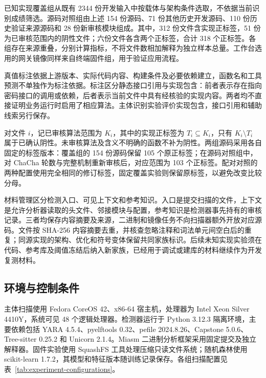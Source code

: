 已知实现覆盖组从既有 2344 份开发输入中按载体与架构条件选取，不依据当前识别成绩筛选。源码对照组由上述 154 份源码、71 份其他历史开发源码、110 份历史验证来源源码和 28 份新审核模块组成。其中，312 份文件含实现正标签，51 份为已审核范围内的阴性文件；六份文件各含两个正标签，合计 318 个正标签。各组存在来源重叠，分别计算指标，不将文件数相加解释为独立样本总量。工作台选用的网关镜像同样来自终端固件组，用于验证应用流程。

真值标注依据上游版本、实际代码内容、构建条件及必要依赖建立，函数名和工具预测不单独作为标注依据。标注区分静态接口引用与实现包含：前者表示存在指向密码接口的调用或依赖，后者表示当前文件中具有经核验的实现内容。两者均不直接证明业务运行时启用了相应算法。主体识别实验评价实现包含，接口引用和辅助线索另行保存。

对文件 $i$，记已审核算法范围为 $K_i$，其中的实现正标签为 $T_i\subseteq K_i$，只有 $K_i\setminus T_i$ 属于已确认阴性。未审核算法及含义不明确的函数不补为阴性。两组源码采用各自固定的标签版本：覆盖组的 154 份源码保留 105 个原正标签；在源码对照组中，对 ChaCha 轮数与完整机制重新审核后，对应范围为 103 个正标签。配对对照的两种配置使用完全相同的修订标签，固定覆盖实验则保留原标签，以避免改变比较分母。

材料管理区分检测入口、可见上下文和参考知识。入口是提交扫描的文件，上下文是允许分析器读取的头文件、邻接模块与配置，参考知识是检测器事先持有的审核记录。三者均保存内容摘要及来源，二进制和镜像任务不向扫描器额外开放对应源码。文件按 SHA-256 内容摘要去重，并核查忽略注释和词法单元间空白后的重复；同源实现的架构、优化和符号变体保留共同家族标识。后续未知实现实验须在代码、参考库及阈值冻结后纳入新家族，已经用于调试或建库的材料继续作为开发复测材料。


\subsection{环境与控制条件}

主体扫描使用 Fedora CoreOS 42、x86-64 宿主机，处理器为 Intel Xeon Silver 4410Y，系统可见 48 个逻辑处理器。检测器运行于 Python 3.12.3 隔离环境，主要依赖包括 YARA 4.5.4、pyelftools 0.32、pefile 2024.8.26、Capstone 5.0.6、Tree-sitter 0.25.2 和 Unicorn 2.1.4。Miasm 二进制分析框架采用固定提交及独立解释器\cite{miasm}。固件实验使用 SquashFS 工具处理压缩只读文件系统；随机森林使用 scikit-learn 1.7.2，其模型和特征版本随训练记录保存。各组扫描配置见表~\ref{tab:experiment-configurations}。

